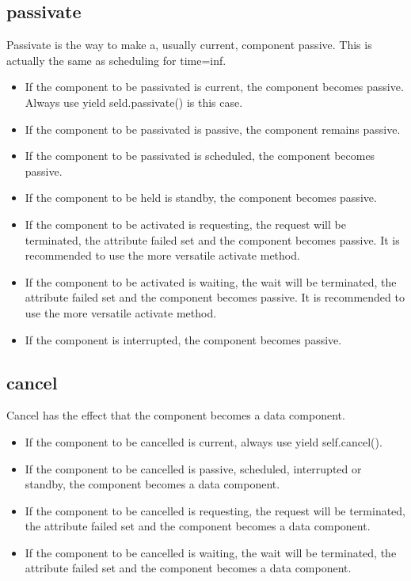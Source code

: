\documentclass[letterpaper,10pt,english]{sphinxmanual}
\begin{document}
\subsection{passivate}
\label{\detokenize{Component:passivate}}
Passivate is the way to make a, usually current, component passive. This is actually the
same as scheduling for time=inf.
\begin{itemize}
\item {} 
If the component to be passivated is current, the component becomes passive. Always
use yield seld.passivate() is this case.

\item {} 
If the component to be passivated is passive, the component remains passive.

\item {} 
If the component to be passivated is scheduled, the component becomes passive.

\item {} 
If the component to be held is standby, the component becomes passive.

\item {} 
If the component to be activated is requesting, the request will be terminated, the attribute failed
set and the component becomes passive. It is recommended to use the more versatile activate method.

\item {} 
If the component to be activated is waiting, the wait will be
terminated, the attribute failed set and the component becomes passive. It is recommended to
use the more versatile activate method.

\item {} 
If the component is interrupted, the component becomes passive.

\end{itemize}


\subsection{cancel}
\label{\detokenize{Component:cancel}}
Cancel has the effect that the component becomes a data component.
\begin{itemize}
\item {} 
If the component to be cancelled is current, always use yield self.cancel().

\item {} 
If the component to be cancelled is passive, scheduled, interrupted  or standby, the component becomes a data component.

\item {} 
If the component to be cancelled is requesting, the request will be terminated, the attribute failed
set and the component becomes a data component.

\item {} 
If the component to be cancelled is waiting, the wait will be terminated, the attribute failed
set and the component becomes a data component.

\end{itemize}
\end{document}
